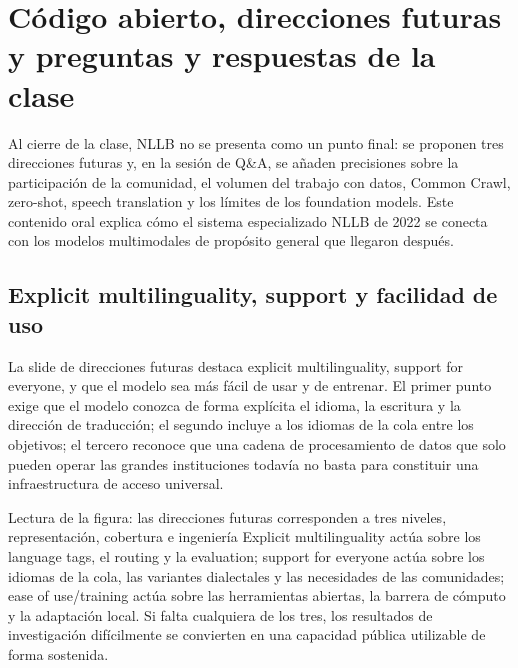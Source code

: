 \section{Código abierto, direcciones futuras y preguntas y respuestas de la clase}

Al cierre de la clase, NLLB no se presenta como un punto final: se proponen tres direcciones futuras y, en la sesión de Q\&A, se añaden precisiones sobre la participación de la comunidad, el volumen del trabajo con datos, Common Crawl, zero-shot, speech translation y los límites de los foundation models. Este contenido oral explica cómo el sistema especializado NLLB de 2022 se conecta con los modelos multimodales de propósito general que llegaron después.

\subsection{Explicit multilinguality, support y facilidad de uso}

La slide de direcciones futuras destaca explicit multilinguality, support for everyone, y que el modelo sea más fácil de usar y de entrenar. El primer punto exige que el modelo conozca de forma explícita el idioma, la escritura y la dirección de traducción; el segundo incluye a los idiomas de la cola entre los objetivos; el tercero reconoce que una cadena de procesamiento de datos que solo pueden operar las grandes instituciones todavía no basta para constituir una infraestructura de acceso universal.


\begin{knowledgebox}{Lectura de la figura: las direcciones futuras corresponden a tres niveles, representación, cobertura e ingeniería}
Explicit multilinguality actúa sobre los language tags, el routing y la evaluation; support for everyone actúa sobre los idiomas de la cola, las variantes dialectales y las necesidades de las comunidades; ease of use/training actúa sobre las herramientas abiertas, la barrera de cómputo y la adaptación local. Si falta cualquiera de los tres, los resultados de investigación difícilmente se convierten en una capacidad pública utilizable de forma sostenida.
\end{knowledgebox}


